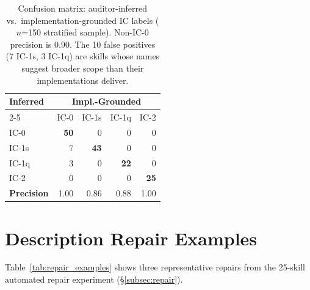 \documentclass[11pt]{article}
\begin{document}
\begin{table}[t]
\centering\small
\begin{tabular}{lrrrr}
\toprule
\multirow{2}{*}{\textbf{Inferred}} & \multicolumn{4}{c}{\textbf{Impl.-Grounded}} \\
\cmidrule{2-5}
 & IC-0 & IC-1s & IC-1q & IC-2 \\
\midrule
IC-0  & \textbf{50} & 0  & 0  & 0 \\
IC-1s & 7  & \textbf{43} & 0  & 0 \\
IC-1q & 3  & 0  & \textbf{22} & 0 \\
IC-2  & 0  & 0  & 0  & \textbf{25} \\
\midrule
\textbf{Precision} & 1.00 & 0.86 & 0.88 & 1.00 \\
\bottomrule
\end{tabular}
\caption{Confusion matrix: auditor-inferred vs.\
implementation-grounded IC labels ($n$=150 stratified sample).
Non-IC-0 precision is 0.90. The 10 false positives
(7 IC-1s, 3 IC-1q) are skills whose names suggest broader
scope than their implementations deliver.}
\label{tab:impl_confusion}
\end{table}

\section{Description Repair Examples}
\label{app:repairs}

Table~\ref{tab:repair_examples} shows three representative
repairs from the 25-skill automated repair experiment
(\S\ref{subsec:repair}).
\end{document}
